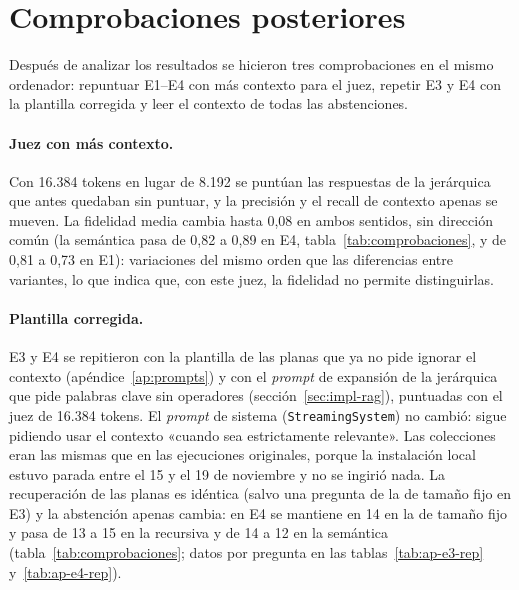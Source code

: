 \section{Comprobaciones posteriores}
\label{sec:comprobaciones}

Después de analizar los resultados se hicieron tres comprobaciones en el mismo ordenador: repuntuar E1--E4 con más contexto para el juez, repetir E3 y E4 con la plantilla corregida y leer el contexto de todas las abstenciones.

\paragraph{Juez con más contexto.} Con 16.384 tokens en lugar de 8.192 se puntúan las respuestas de la jerárquica que antes quedaban sin puntuar, y la precisión y el recall de contexto apenas se mueven. La fidelidad media cambia hasta 0,08 en ambos sentidos, sin dirección común (la semántica pasa de 0,82 a 0,89 en E4, tabla~\ref{tab:comprobaciones}, y de 0,81 a 0,73 en E1): variaciones del mismo orden que las diferencias entre variantes, lo que indica que, con este juez, la fidelidad no permite distinguirlas.

\paragraph{Plantilla corregida.} E3 y E4 se repitieron con la plantilla de las planas que ya no pide ignorar el contexto (apéndice~\ref{ap:prompts}) y con el \emph{prompt} de expansión de la jerárquica que pide palabras clave sin operadores (sección~\ref{sec:impl-rag}), puntuadas con el juez de 16.384 tokens. El \emph{prompt} de sistema (\texttt{StreamingSystem}) no cambió: sigue pidiendo usar el contexto «cuando sea estrictamente relevante». Las colecciones eran las mismas que en las ejecuciones originales, porque la instalación local estuvo parada entre el 15 y el 19 de noviembre y no se ingirió nada. La recuperación de las planas es idéntica (salvo una pregunta de la de tamaño fijo en E3) y la abstención apenas cambia: en E4 se mantiene en 14 en la de tamaño fijo y pasa de 13 a 15 en la recursiva y de 14 a 12 en la semántica (tabla~\ref{tab:comprobaciones}; datos por pregunta en las tablas~\ref{tab:ap-e3-rep} y~\ref{tab:ap-e4-rep}).

